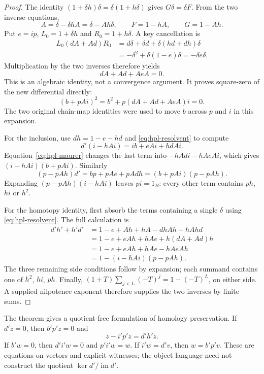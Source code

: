 \begin{proof}
The identity $(1+\delta h)\delta=\delta(1+h\delta)$ gives $G\delta=\delta F$.
From the two inverse equations,
\begin{equation}
 A=\delta-\delta hA=\delta-Ah\delta,
 \qquad F=1-hA,\qquad G=1-Ah.
 \label{eq:hpl-resolvent}
\end{equation}
Put $e=ip$, $L_0=1+\delta h$ and $R_0=1+h\delta$.  A key cancellation is
\begin{align*}
 L_0(dA+Ad)R_0
 &=d\delta+\delta d+\delta(hd+dh)\delta\\
 &=-\delta^2+\delta(1-e)\delta=-\delta e\delta.
\end{align*}
Multiplication by the two inverses therefore yields
\begin{equation}
 dA+Ad+AeA=0.
 \label{eq:hpl-maurer}
\end{equation}
This is an algebraic identity, not a convergence argument.  It proves
square-zero of the new differential directly:
\[
 (b+pAi)^2
 =b^2+p(dA+Ad+AeA)i=0.
\]
The two original chain-map identities were used to move $b$ across $p$ and
$i$ in this expansion.

For the inclusion, use $dh=1-e-hd$ and \eqref{eq:hpl-resolvent} to compute
\[
 d'(i-hAi)=ib+eAi+hdAi.
\]
Equation~\eqref{eq:hpl-maurer} changes the last term into
$-hAdi-hAeAi$, which gives $(i-hAi)(b+pAi)$.  Similarly
\[
 (p-pAh)d'=bp+pAe+pAdh
              =(b+pAi)(p-pAh).
\]
Expanding $(p-pAh)(i-hAi)$ leaves $pi=1_B$: every other term contains
$ph$, $hi$ or $h^2$.

For the homotopy identity, first absorb the terms containing a single
$\delta$ using \eqref{eq:hpl-resolvent}.  The full calculation is
\begin{align*}
 d'h'+h'd'
 &=1-e+Ah+hA-dhAh-hAhd\\
 &=1-e+eAh+hAe+h(dA+Ad)h\\
 &=1-e+eAh+hAe-hAeAh\\
 &=1-(i-hAi)(p-pAh).
\end{align*}
The three remaining side conditions follow by expansion; each summand
contains one of $h^2$, $hi$, $ph$.  Finally,
$(1+T)\sum_{j<L}(-T)^j=1-(-T)^L$, on either side.  A supplied
nilpotence exponent therefore supplies the two inverses by finite sums.
\end{proof}

The theorem gives a quotient-free formulation of homology preservation.
If $d'z=0$, then $b'p'z=0$ and
\begin{equation}
 z-i'p'z=d'h'z.
 \label{eq:hpl-cycle-transfer}
\end{equation}
If $b'w=0$, then $d'i'w=0$ and $p'i'w=w$.  If $i'w=d'v$, then
$w=b'p'v$.  These are equations on vectors and explicit witnesses; the
object language need not construct the quotient $\ker d'/\operatorname{im}d'$.

